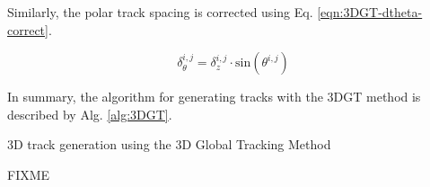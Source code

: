 \noindent
Similarly, the polar track spacing is corrected using Eq. \ref{eqn:3DGT-dtheta-correct}.

\begin{equation}
\delta_\theta^{i,j} = \delta_z^{i,j} \cdot \text{sin} (\theta^{i,j})
\label{eqn:3DGT-dtheta-correct}
\end{equation}

\noindent
In summary, the algorithm for generating tracks with the 3DGT method is described by Alg. \ref{alg:3DGT}.

\begin{algorithm*}[!h]
	\caption{3D track generation using the 3D Global Tracking Method}
	\label{alg:3DGT}
		
		
		
		
		
		
		
		
		
FIXME
\end{algorithm*}

